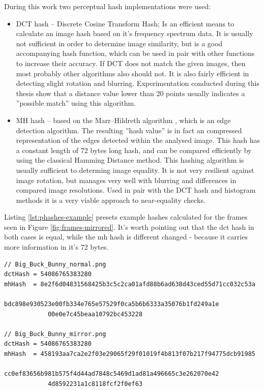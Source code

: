 During this work two perceptual hash implementations were used:
\begin{itemize}
  \item DCT hash -- Discrete Cosine Transform Hash; Is an efficient means to calculate an image hash based on it's
                    frequency spectrum data. It is usually not sufficient in order to determine image similarity, 
                    but is a good accompanying hash function, which can be used in pair with other functions to increase 
                    their accuracy. If DCT does not match the given images, then most probably other algorithms also 
                    should not. It is also fairly efficient in detecting slight rotation and blurring. Experimentation 
                    conducted during this thesis show that a distance value lower than 20 points usually indicates a 
                    ''possible match'' using this algorithm.
                    
  \item MH hash -- based on the Marr--Hildreth algorithm \cite{marr-hildreth}, which is an edge detection algorithm.
                   The resulting ''hash value'' is in fact an compressed representation of the edges detected within the 
                   analysed image. This hash has a constant length of 72 bytes long hash, and can be compared efficiently 
                   by using the classical Hamming Distance \cite{hamming-distance} method. This hashing algorithm is
                   usually sufficient to determing image equality. It is not very resilient against image rotation, but 
                   manages very well with blurring and differences in compared image resolutions. Used in pair with the 
                   DCT hash and histogram methods it is a very viable approach to near-equality checks.
\end{itemize}

Listing \ref{lst:phashes-example} presets example hashes calculated for the frames seen in Figure \ref{fig:frames-mirrored}. It's worth pointing out that the dct hash in both cases is equal, while the mh hash is different changed - because it carries more information in it's 72 bytes.

\begin{lstlisting}[caption={Example hashes, calculated for a original and mirrored frame}, label={lst:phashes-example}]
// Big_Buck_Bunny_normal.png
dctHash = 54086765383280
mhHash  = 8e2f6d04831568425b3c5c2ca01afd88b6ad638d43ced55d71cc032c53a
            bdc898e930523e00fb334e765e57529f0ca5b6b6333a35076b1fd249a1e
            00e0e7c45beaa10792bc453228
                        
// Big_Buck_Bunny_mirror.png
dctHash = 54086765383280
mhHash  = 458193aa7ca2e2f03e29065f29f01019f4b813f07b217f94775dcb91985
            cc0ef83656b981b575f4d44ad7848c5469d1ad81a496665c3e262070e42
            4d8592231a1c8118fcf2f0ef63
\end{lstlisting}


